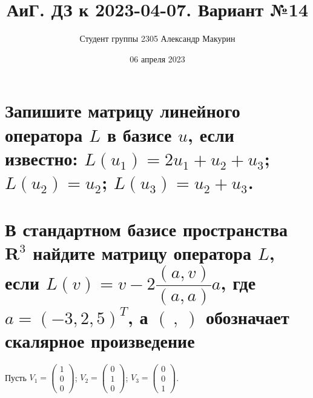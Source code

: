 \documentclass[12pt]{article}
\title{АиГ. ДЗ к 2023-04-07. Вариант №14}
\author{Студент группы 2305 Александр Макурин}
\date{06 апреля 2023}
\begin{document}
\maketitle

\begin{sloppypar}
    \section{Запишите матрицу линейного оператора $L$ в базисе $u$, если известно: $L(u_1) = 2u_1 + u_2 + u_3$; $L(u_2) = u_2$;
      $L(u_3) = u_2 + u_3$.}


    \section{В стандартном базисе пространства $\mathbf{R}^3$ найдите матрицу оператора $L$, если $L(v) = v - 2\dfrac{(a,v)}{(a,a)}a$, где $a = (-3, 2, 5)^T$, а $(\ ,\ )$ обозначает скалярное произведение}
    Пусть $V_1 = \begin{pmatrix} 1 \\ 0 \\ 0 \end{pmatrix}$;
    $V_2 = \begin{pmatrix} 0 \\ 1 \\ 0 \end{pmatrix}$;
    $V_3 = \begin{pmatrix} 0 \\ 0 \\ 1 \end{pmatrix}$.


\end{sloppypar}
\end{document}
